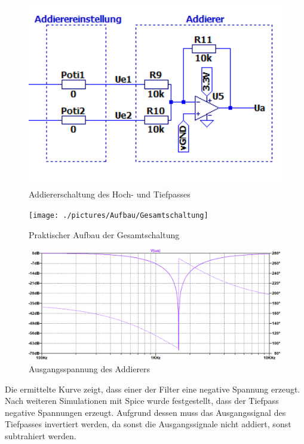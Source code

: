 \begin{figure}[htb]
    \includegraphics[width=14cm]{./pictures/Addierer}
    \caption{Addiererschaltung des Hoch- und Tiefpasses}
    \label{fig:Addierer}
\end{figure}

\begin{figure}[htb]
    \texttt{[image: ./pictures/Aufbau/Gesamtschaltung]}
    \caption{Praktischer Aufbau der Gesamtschaltung}
    \label{fig:GesamtschaltungPraktisch}
\end{figure}

\newpage
\begin{figure}[htb]
    \includegraphics[width=16cm]{./pictures/Gesamtschaltung}
    \caption{Ausgangsspannung des Addierers}
    \label{fig:AddiererAusgangsspannung}
\end{figure}

Die ermittelte Kurve zeigt, dass einer der Filter eine negative Spannung erzeugt. Nach weiteren Simulationen mit Spice wurde festgestellt, dass der Tiefpass negative Spannungen erzeugt. Aufgrund dessen muss das Ausgangssignal des Tiefpasses invertiert werden, da sonst die Ausgangssignale nicht addiert, sonst subtrahiert werden.

